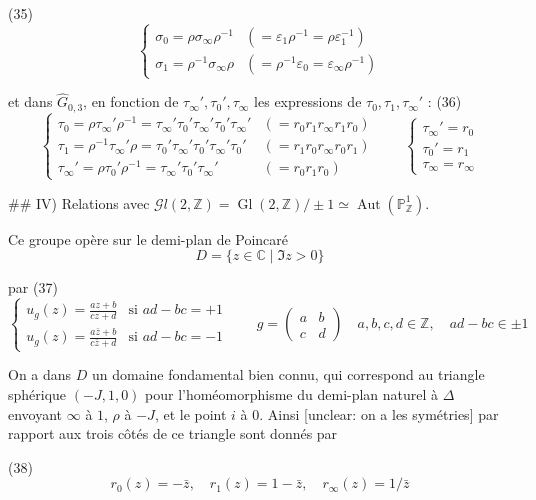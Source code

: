 (35)
$$ \begin{cases}
\sigma_0 = \rho \sigma_\infty \rho^{-1} & (= \varepsilon_1 \rho^{-1} = \rho \varepsilon_1^{-1}) \\
\sigma_1 = \rho^{-1} \sigma_\infty \rho & (= \rho^{-1} \varepsilon_0 = \varepsilon_\infty \rho^{-1})
\end{cases} $$

et dans $\widehat{G}_{0,3}$, en fonction de $\tau_\infty', \tau_0', \tau_\infty$
les expressions de $\tau_0, \tau_1, \tau_\infty'$ :
(36)
$$ \begin{cases}
\tau_0 = \rho \tau_\infty' \rho^{-1} = \tau_\infty' \tau_0' \tau_\infty' \tau_0' \tau_\infty' & (= r_0 r_1 r_\infty r_1 r_0) \\
\tau_1 = \rho^{-1} \tau_\infty' \rho = \tau_0' \tau_\infty' \tau_0' \tau_\infty' \tau_0' & (= r_1 r_0 r_\infty r_0 r_1) \\
\tau_\infty' = \rho \tau_0' \rho^{-1} = \tau_\infty' \tau_0' \tau_\infty' & (= r_0 r_1 r_0)
\end{cases} \qquad \begin{cases} \tau_\infty' = r_0 \\ \tau_0' = r_1 \\ \tau_\infty = r_\infty \end{cases} $$

## IV) Relations avec $\mathcal{G}l(2, \mathbb{Z}) = \operatorname{Gl}(2, \mathbb{Z})/\pm 1 \simeq \operatorname{Aut}(\mathbb{P}^1_{\mathbb{Z}})$.

Ce groupe opère sur le demi-plan de Poincaré
$$D = \{z \in \mathbb{C} \mid \Im z > 0\}$$

par
(37)
$$ \begin{cases}
u_g(z) = \frac{az+b}{cz+d} & \text{si } ad-bc = +1 \\
u_g(z) = \frac{a\bar{z}+b}{c\bar{z}+d} & \text{si } ad-bc = -1
\end{cases} \qquad g = \begin{pmatrix} a & b \\ c & d \end{pmatrix} \quad a,b,c,d \in \mathbb{Z}, \quad ad-bc \in \pm 1 $$

On a dans $D$ un domaine fondamental bien connu, qui correspond au triangle sphérique $(-J, 1, 0)$ pour l'homéomorphisme du demi-plan naturel à $\Delta$ envoyant $\infty$ à $1$, $\rho$ à $-J$, et le point $i$ à $0$. Ainsi [unclear: on a les symétries] par rapport aux trois côtés de ce triangle sont donnés par

(38)
$$ r_0(z) = -\bar{z}, \quad r_1(z) = 1-\bar{z}, \quad r_\infty(z) = 1/\bar{z} $$

